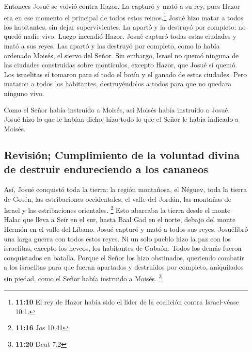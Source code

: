 Entonces Josué se volvió contra Hazor. La capturó y mató
a su rey, pues Hazor era en ese momento el principal de todos estos
reinos.\footnote{\textbf{11:10} El rey de Hazor había sido el líder de
  la coalición contra Israel-véase 10:1.}  Josué hizo
matar a todos los habitantes, sin dejar supervivientes. La apartó y la
destruyó por completo: no quedó nadie vivo. Luego incendió Hazor.
 Josué capturó todas estas ciudades y mató a sus reyes.
Las apartó y las destruyó por completo, como lo había ordenado Moisés,
el siervo del Señor.  Sin embargo, Israel no quemó
ninguna de las ciudades construidas sobre montículos, excepto Hazor, que
Josué sí quemó.  Los israelitas sí tomaron para sí todo
el botín y el ganado de estas ciudades. Pero mataron a todos los
habitantes, destruyéndolos a todos para que no quedara ninguno vivo.

 Como el Señor había instruido a Moisés, así Moisés había
instruido a Josué. Josué hizo lo que le habían dicho: hizo todo lo que
el Señor le había indicado a Moisés.

\hypertarget{revisiuxf3n-cumplimiento-de-la-voluntad-divina-de-destruir-endureciendo-a-los-cananeos}{%
\subsection{Revisión; Cumplimiento de la voluntad divina de destruir
endureciendo a los
cananeos}\label{revisiuxf3n-cumplimiento-de-la-voluntad-divina-de-destruir-endureciendo-a-los-cananeos}}

 Así, Josué conquistó toda la tierra: la región
montañosa, el Néguev, toda la tierra de Gosén, las estribaciones
occidentales, el valle del Jordán, las montañas de Israel y las
estribaciones orientales. \footnote{\textbf{11:16} Jos 10,41}
 Esto abarcaba la tierra desde el monte Halac que lleva a
Seír en el sur, hasta Baal Gad en el norte, debajo del monte Hermón en
el valle del Líbano. Josué capturó y mató a todos sus reyes.
 Josuélibró una larga guerra con todos estos reyes.
 Ni un solo pueblo hizo la paz con los israelitas,
excepto los heveos, los habitantes de Gabaón. Todos los demás fueron
conquistados en batalla.  Porque el Señor los hizo
obstinados, queriendo combatir a los israelitas para que fueran
apartados y destruidos por completo, aniquilados sin piedad, como el
Señor había instruido a Moisés. \footnote{\textbf{11:20} Deut 7,2}

